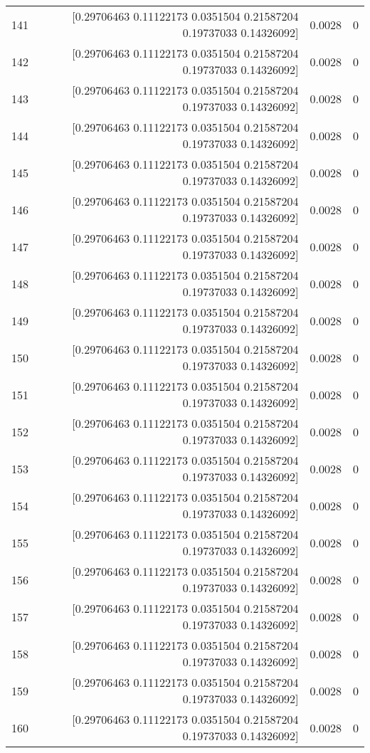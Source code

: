 \begin{longtable}{lrrr}
141 & [0.29706463 0.11122173 0.0351504  0.21587204 0.19737033 0.14326092] & 0.0028 & 0 \\
142 & [0.29706463 0.11122173 0.0351504  0.21587204 0.19737033 0.14326092] & 0.0028 & 0 \\
143 & [0.29706463 0.11122173 0.0351504  0.21587204 0.19737033 0.14326092] & 0.0028 & 0 \\
144 & [0.29706463 0.11122173 0.0351504  0.21587204 0.19737033 0.14326092] & 0.0028 & 0 \\
145 & [0.29706463 0.11122173 0.0351504  0.21587204 0.19737033 0.14326092] & 0.0028 & 0 \\
146 & [0.29706463 0.11122173 0.0351504  0.21587204 0.19737033 0.14326092] & 0.0028 & 0 \\
147 & [0.29706463 0.11122173 0.0351504  0.21587204 0.19737033 0.14326092] & 0.0028 & 0 \\
148 & [0.29706463 0.11122173 0.0351504  0.21587204 0.19737033 0.14326092] & 0.0028 & 0 \\
149 & [0.29706463 0.11122173 0.0351504  0.21587204 0.19737033 0.14326092] & 0.0028 & 0 \\
150 & [0.29706463 0.11122173 0.0351504  0.21587204 0.19737033 0.14326092] & 0.0028 & 0 \\
151 & [0.29706463 0.11122173 0.0351504  0.21587204 0.19737033 0.14326092] & 0.0028 & 0 \\
152 & [0.29706463 0.11122173 0.0351504  0.21587204 0.19737033 0.14326092] & 0.0028 & 0 \\
153 & [0.29706463 0.11122173 0.0351504  0.21587204 0.19737033 0.14326092] & 0.0028 & 0 \\
154 & [0.29706463 0.11122173 0.0351504  0.21587204 0.19737033 0.14326092] & 0.0028 & 0 \\
155 & [0.29706463 0.11122173 0.0351504  0.21587204 0.19737033 0.14326092] & 0.0028 & 0 \\
156 & [0.29706463 0.11122173 0.0351504  0.21587204 0.19737033 0.14326092] & 0.0028 & 0 \\
157 & [0.29706463 0.11122173 0.0351504  0.21587204 0.19737033 0.14326092] & 0.0028 & 0 \\
158 & [0.29706463 0.11122173 0.0351504  0.21587204 0.19737033 0.14326092] & 0.0028 & 0 \\
159 & [0.29706463 0.11122173 0.0351504  0.21587204 0.19737033 0.14326092] & 0.0028 & 0 \\
160 & [0.29706463 0.11122173 0.0351504  0.21587204 0.19737033 0.14326092] & 0.0028 & 0 \\

\end{longtable}
